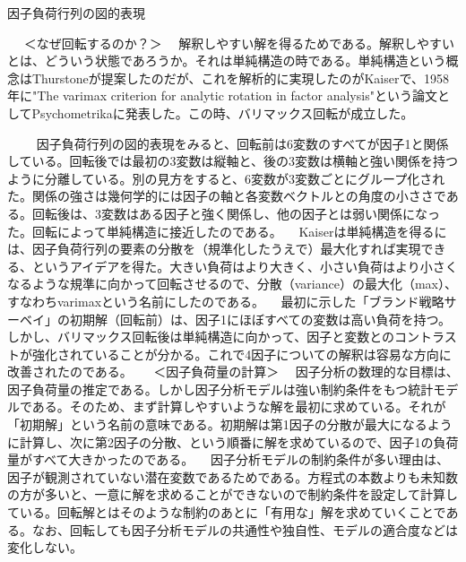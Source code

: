\documentclass[a4j,11pt,mc, twocolumn]{jreport}
\begin{document}
	因子負荷行列の図的表現
	　

	　
	＜なぜ回転するのか？＞
	　解釈しやすい解を得るためである。解釈しやすいとは、どういう状態であろうか。それは単純構造の時である。単純構造という概念はThurstoneが提案したのだが、これを解析的に実現したのがKaiserで、1958年に"The varimax criterion for analytic rotation in factor analysis"という論文としてPsychometrikaに発表した。この時、バリマックス回転が成立した。
	　

	　
	　因子負荷行列の図的表現をみると、回転前は6変数のすべてが因子1と関係している。回転後では最初の3変数は縦軸と、後の3変数は横軸と強い関係を持つように分離している。別の見方をすると、6変数が3変数ごとにグループ化された。関係の強さは幾何学的には因子の軸と各変数ベクトルとの角度の小ささである。回転後は、3変数はある因子と強く関係し、他の因子とは弱い関係になった。回転によって単純構造に接近したのである。
	　Kaiserは単純構造を得るには、因子負荷行列の要素の分散を（規準化したうえで）最大化すれば実現できる、というアイデアを得た。大きい負荷はより大きく、小さい負荷はより小さくなるような規準に向かって回転させるので、分散（variance）の最大化（max）、すなわちvarimaxという名前にしたのである。
	　最初に示した「ブランド戦略サーベイ」の初期解（回転前）は、因子1にほぼすべての変数は高い負荷を持つ。しかし、バリマックス回転後は単純構造に向かって、因子と変数とのコントラストが強化されていることが分かる。これで4因子についての解釈は容易な方向に改善されたのである。
	 　
	＜因子負荷量の計算＞
	　因子分析の数理的な目標は、因子負荷量の推定である。しかし因子分析モデルは強い制約条件をもつ統計モデルである。そのため、まず計算しやすいような解を最初に求めている。それが「初期解」という名前の意味である。初期解は第1因子の分散が最大になるように計算し、次に第2因子の分散、という順番に解を求めているので、因子1の負荷量がすべて大きかったのである。
	　因子分析モデルの制約条件が多い理由は、因子が観測されていない潜在変数であるためである。方程式の本数よりも未知数の方が多いと、一意に解を求めることができないので制約条件を設定して計算している。回転解とはそのような制約のあとに「有用な」解を求めていくことである。なお、回転しても因子分析モデルの共通性や独自性、モデルの適合度などは変化しない。



\end{document}
